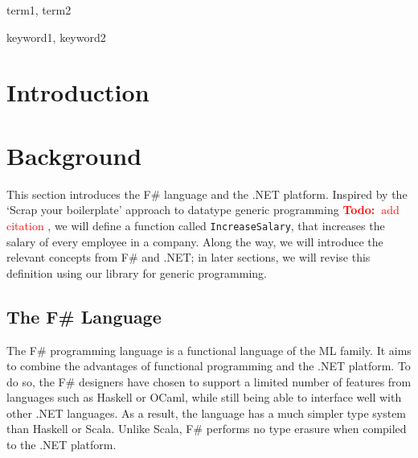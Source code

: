 \documentclass{sigplanconf}
\newcommand{\todo}[1]{
\ifthenelse
  {\boolean{showNotes}}
  {\textcolor{red}{\textbf{Todo:~}#1}}
  {}}
\begin{document}

\terms
term1, term2

\keywords
keyword1, keyword2

\section{Introduction}

\section{Background}
This section introduces the F\# language and the .NET
platform. Inspired by the `Scrap your boilerplate' approach to
datatype generic programming \todo{add citation}, we will define a
function called \verb+IncreaseSalary+, that increases the salary of
every employee in a company. Along the way, we will introduce the
relevant concepts from F\# and .NET; in later sections, we will revise
this definition using our library for generic programming.

\subsection{The F\# Language}
The F\# programming language is a functional language of the ML
family. It aims to combine the advantages of
functional programming and the .NET platform. To do so, the F\# designers
have chosen to support a limited number of features from languages such as Haskell or OCaml, 
while still being able to interface well with other .NET languages.
As a result, the language
has a much simpler type system than Haskell or Scala.
Unlike Scala, F\# performs no type erasure when compiled
to the .NET platform.
\end{document}
